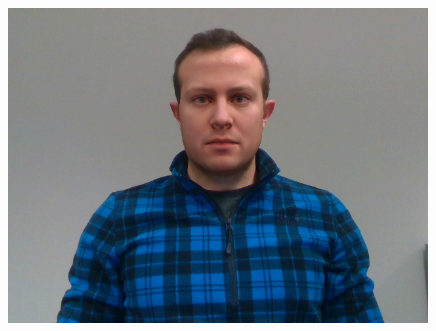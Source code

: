 \begin{figure}[h]
\begin{minipage}{.325\textwidth}
      \includegraphics[width=0.99\textwidth]{Figures/dataset/blended/1.png}
    \end{minipage}


\end{figure}
